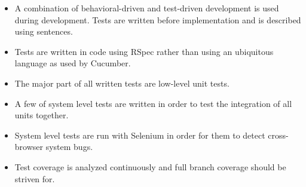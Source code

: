 
\begin{itemize}
    \item A combination of behavioral-driven and test-driven development
          is used during development. Tests are written before
          implementation and is described using sentences.
    \item Tests are written in code using RSpec rather than using an
          ubiquitous language as used by Cucumber.
    \item The major part of all written tests are low-level unit tests.
    \item A few of system level tests are written in order to test the
          integration of all units together.
    \item System level tests are run with Selenium in order for them
          to detect cross-browser system bugs.
    \item Test coverage is analyzed continuously and full branch
          coverage should be striven for.
\end{itemize}
